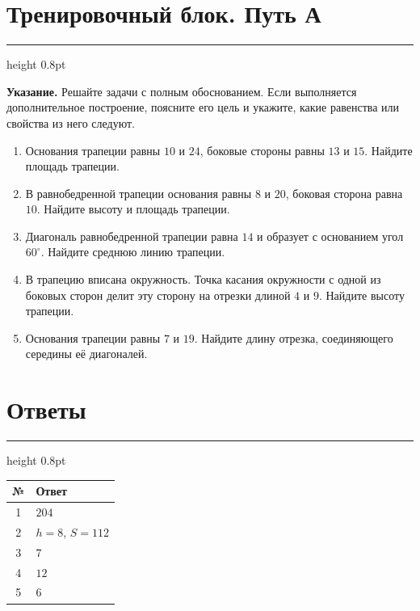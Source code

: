 \documentclass[a4paper,12pt]{article}
\newcommand{\sectionline}{
  \par
  \vspace{0.2em}
  {\color{accent}\hrule height 0.8pt}
  \vspace{0.7em}
}
\begin{document}

\clearpage

\section*{Тренировочный блок. Путь А}
\sectionline

\textbf{Указание.}
Решайте задачи с полным обоснованием. Если выполняется дополнительное
построение, поясните его цель и укажите, какие равенства или свойства
из него следуют.

\begin{enumerate}

\item
Основания трапеции равны $10$ и $24$, боковые стороны равны $13$ и $15$.
Найдите площадь трапеции.

\item
В равнобедренной трапеции основания равны $8$ и $20$, боковая сторона
равна $10$. Найдите высоту и площадь трапеции.

\item
Диагональ равнобедренной трапеции равна $14$ и образует с основанием
угол $60^\circ$. Найдите среднюю линию трапеции.

\item
В трапецию вписана окружность. Точка касания окружности с одной из боковых
сторон делит эту сторону на отрезки длиной $4$ и $9$.
Найдите высоту трапеции.

\item
Основания трапеции равны $7$ и $19$.
Найдите длину отрезка, соединяющего середины её диагоналей.

\end{enumerate}


\clearpage

\section*{Ответы}
\sectionline

\renewcommand{\arraystretch}{1.35}

\begin{table}[ht]
\centering

\begin{tabularx}{\linewidth}{@{}cX@{}}

\toprule

\textbf{№}
&
\textbf{Ответ}
\\

\midrule

1
&
$204$
\\

2
&
$h=8$, \quad $S=112$
\\

3
&
$7$
\\

4
&
$12$
\\

5
&
$6$
\\

\bottomrule

\end{tabularx}

\end{table}
\end{document}
